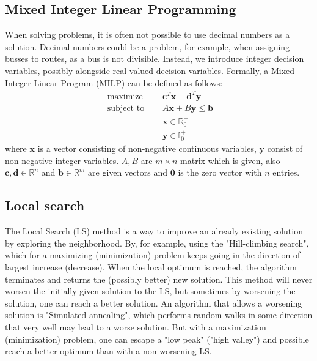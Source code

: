 \documentclass[a4paper,12pt]{article}
\begin{document}
\subsection*{Mixed Integer Linear Programming}

When solving problems, it is often not possible to use decimal numbers as a solution. Decimal numbers could be a problem, for example, when assigning busses to routes, as a bus is not divisible. Instead, we introduce integer decision variables, possibly alongside real-valued decision variables. Formally, a Mixed Integer Linear Program (MILP) can be defined as follows:
$$
\begin{aligned} 
    \text { maximize } & \quad \mathbf{c}^{T} \mathbf{x} + \mathbf{d}^{T} \mathbf{y} \\
    \text { subject to } & \quad A \mathbf{x} + B \mathbf{y} \leq \mathbf{b} \\
    & \quad \mathbf{x} \in \mathbb{R}_{0}^{+} \\
    & \quad \mathbf{y} \in \mathbb{I}_{0}^{+}
\end{aligned}
$$
where $\mathbf{x}$ is a vector consisting of non-negative continuous variables, $\mathbf{y}$ consist of non-negative integer variables. $A, B$ are $m \times n$ matrix which is given, also $\mathbf{c}, \mathbf{d} \in \mathbb{R}^n$ and $\mathbf{b} \in \mathbb{R}^m$ are given vectors and $\mathbf{0}$ is the zero vector with $n$ entries.

\bigbreak
\subsection*{Local search}

The Local Search (LS) method is a way to improve an already existing solution by exploring the neighborhood. By, for example, using the "Hill-climbing search", which for a maximizing (minimization) problem keeps going in the direction of largest increase (decrease). When the local optimum is reached, the algorithm terminates and returns the (possibly better) new solution. This method will never worsen the initially given solution to the LS, but sometimes by worsening the solution, one can reach a better solution. An algorithm that allows a worsening solution is "Simulated annealing", which performs random walks in some direction that very well may lead to a worse solution. But with a maximization (minimization) problem, one can escape a "low peak" ("high valley") and possible reach a better optimum than with a non-worsening LS.
\end{document}
